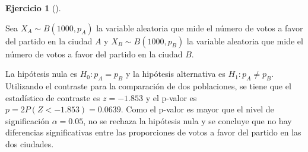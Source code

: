 \documentclass[
  a4paper,
]{scrreport}
\theoremstyle{definition}
\newtheorem{exercise}{Ejercicio}[chapter]
\theoremstyle{remark}
\begin{document}
\begin{exercise}[]
\begin{tcolorbox}
Sea \(X_A\sim B(1000,p_A)\) la variable aleatoria que mide el número de
votos a favor del partido en la ciudad \(A\) y \(X_B\sim B(1000,p_B)\)
la variable aleatoria que mide el número de votos a favor del partido en
la ciudad \(B\).

La hipótesis nula es \(H_0: p_A=p_B\) y la hipótesis alternativa es
\(H_1: p_A\neq p_B\). Utilizando el contraste para la comparación de dos
poblaciones, se tiene que el estadístico de contraste es \(z=-1.853\) y
el p-valor es \(p =2 P(Z<-1.853) = 0.0639\). Como el p-valor es mayor
que el nivel de significación \(\alpha = 0.05\), no se rechaza la
hipótesis nula y se concluye que no hay diferencias significativas entre
las proporciones de votos a favor del partido en las dos ciudades.

\end{tcolorbox}

\end{exercise}
\end{document}

